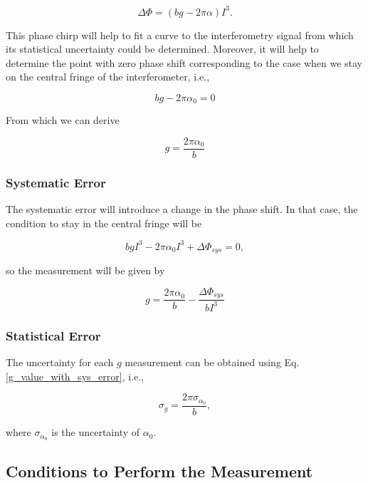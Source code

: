 \documentclass{article}
\begin{document}
\begin{equation}
    \Delta \Phi = (b g  - 2\pi \alpha) I^3.
\end{equation}

This phase chirp will help to fit a curve to the interferometry signal from which its statistical uncertainty could be determined. Moreover, it will help to determine the point with zero phase shift corresponding to the case when we stay on the central fringe of the interferometer, i.e.,

\begin{equation}
    b g  - 2\pi \alpha_{0} = 0
\end{equation}

From which we can derive

\begin{equation}
    g = \frac{2\pi \alpha_{0}}{b}
\end{equation}

\subsubsection{Systematic Error}
The systematic error will introduce a change in the phase shift. In that case, the condition to stay in the central fringe will be

\begin{equation}
    b g I^3 - 2\pi \alpha_{0} I^3 + \Delta \Phi_{sys}= 0,
\end{equation}

so the measurement will be given by

\begin{equation}\label{g_value_with_sys_error}
    g = \frac{2\pi \alpha_{0}}{b} - \frac{\Delta \Phi_{sys}}{b I^3}
\end{equation}

\subsubsection{Statistical Error}
The uncertainty for each $g$ measurement can be obtained using Eq. \ref{g_value_with_sys_error}, i.e.,

\begin{equation}
    \sigma_{g} = \frac{2\pi \sigma_{\alpha_{0}}}{b},
\end{equation}

where $\sigma_{\alpha_{0}}$ is the uncertainty of $\alpha_{0}$.

\subsection{Conditions to Perform the Measurement}
\end{document}
